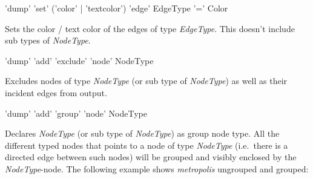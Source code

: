 \documentclass[a4paper,11pt]{report}
\begin{document}
\begin{rail}
  'dump' 'set' ('color' | 'textcolor') 'edge' EdgeType '=' Color
\end{rail}
Sets the color / text color of the edges of type \emph{EdgeType}. This doesn't include sub types of \emph{NodeType}.

\begin{rail}
  'dump' 'add' 'exclude' 'node' NodeType
\end{rail}
Excludes nodes of type \emph{NodeType} (or sub type of \emph{NodeType}) as well as their incident edges from output.

\begin{rail}
  'dump' 'add' 'group' 'node' NodeType
\end{rail}
Declares \emph{NodeType} (or sub type of \emph{NodeType}) as group node type. All the different typed nodes that points to a node of type \emph{NodeType} (i.e.\ there is a directed edge between such nodes) will be grouped and visibly enclosed by the \emph{NodeType}-node.
The following example shows \emph{metropolis} ungrouped and grouped:
\begin{center}
    \hfill {}
\end{center}
\end{document}
